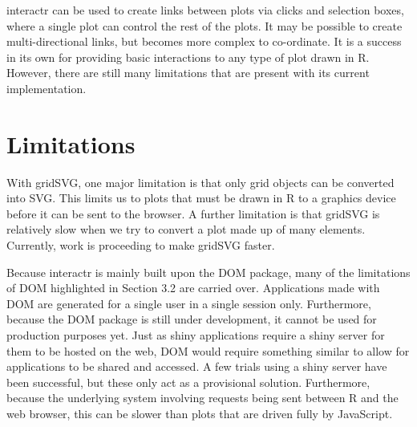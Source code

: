 \documentclass[11pt,]{report}
\begin{document}
\textsf{interactr} can be used to create links between plots via clicks
and selection boxes, where a single plot can control the rest of the
plots. It may be possible to create multi-directional links, but becomes
more complex to co-ordinate. It is a success in its own for providing
basic interactions to any type of plot drawn in R. However, there are
still many limitations that are present with its current implementation.

\hypertarget{limitations}{\section{Limitations}\label{limitations}}

With \textsf{gridSVG}, one major limitation is that only \textsf{grid}
objects can be converted into SVG. This limits us to plots that must be
drawn in R to a graphics device before it can be sent to the browser. A
further limitation is that \textsf{gridSVG} is relatively slow when we
try to convert a plot made up of many elements. Currently, work is
proceeding to make \textsf{gridSVG} faster.

Because \textsf{interactr} is mainly built upon the \textsf{DOM}
package, many of the limitations of \textsf{DOM} highlighted in Section
3.2 are carried over. Applications made with \textsf{DOM} are generated
for a single user in a single session only. Furthermore, because the
\textsf{DOM} package is still under development, it cannot be used for
production purposes yet. Just as \textsf{shiny} applications require a
\textsf{shiny} server for them to be hosted on the web, \textsf{DOM}
would require something similar to allow for applications to be shared
and accessed. A few trials using a \textsf{shiny} server have been
successful, but these only act as a provisional solution. Furthermore,
because the underlying system involving requests being sent between R
and the web browser, this can be slower than plots that are driven fully
by JavaScript.
\end{document}

